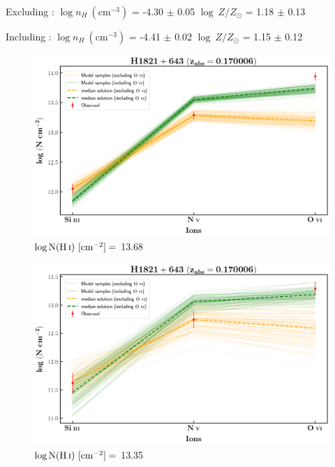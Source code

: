   Excluding  : $\log n_H \ (\text{cm}^{-3})$ = -4.30 $\pm$ 0.05 \hspace{10mm} $\log \ Z/Z_\odot$ = 1.18 $\pm$ 0.13
  
  Including  : $\log n_H \ (\text{cm}^{-3})$ = -4.41 $\pm$ 0.02 \hspace{10mm} $\log \ Z/Z_\odot$ = 1.15 $\pm$ 0.12
  
  
  \newpage
  
  \begin{figure}[!h]
      \centering
      \includegraphics[width=0.85\linewidth]{Ionisation-Modelling-Plots/h1821-z=0.170006-compII.png}
      \caption{$\log \text{N}(\ion{H}{i}) \ [\text{cm}^{-2}]=$ 13.68}
  \end{figure}
  
  \begin{figure}[!b]
      \centering
      \includegraphics[width=0.85\linewidth]{Ionisation-Modelling-Plots/h1821-z=0.170006-compIII.png}
      \caption{$\log \text{N}(\ion{H}{i}) \ [\text{cm}^{-2}]=$ 13.35}
  \end{figure}
  
  
  \newpage
  
